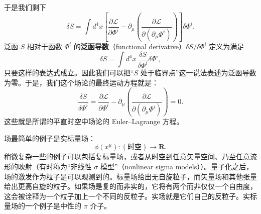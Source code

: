 于是我们剩下
\begin{equation*}
\delta S = \int d^{4}x\left[\frac{\partial\mathcal{L}}{\partial\Phi^{i}} - \partial_{\mu}\left(\frac{\partial\mathcal{L}}{\partial(\partial_{\mu}\Phi^{i})}\right)\right]\delta\Phi^{i}.
\tag{1.142}
\end{equation*}
泛函 $S$ 相对于函数 $\Phi^{i}$ 的\textbf{泛函导数}（functional derivative）$\delta S/\delta\Phi^{i}$ 定义为满足
\begin{equation*}
\delta S = \int d^{4}x\, \frac{\delta S}{\delta\Phi^{i}}\delta\Phi^{i},
\tag{1.143}
\end{equation*}
只要这样的表达式成立。因此我们可以把“$S$ 处于临界点”这一说法表述为泛函导数为零。于是，我们这个场论的最终运动方程就是：
\begin{equation*}
\boxed{\;\frac{\delta S}{\delta\Phi^{i}} = \frac{\partial\mathcal{L}}{\partial\Phi^{i}} - \partial_{\mu}\left(\frac{\partial\mathcal{L}}{\partial(\partial_{\mu}\Phi^{i})}\right) = 0.\;}
\tag{1.144}
\end{equation*}
这些就是所谓的平直时空中场论的 Euler--Lagrange 方程。

场最简单的例子是实标量场：
\begin{equation*}
\phi(x^{\mu}) : (\text{时空}) \rightarrow \mathbf{R}.
\tag{1.145}
\end{equation*}
稍微复杂一些的例子可以包括复标量场，或者从时空到任意矢量空间、乃至任意流形的映射（有时称为“非线性 $\sigma$ 模型”（nonlinear sigma models））。量子化之后，场的激发作为粒子是可以观测到的。标量场给出无自旋粒子，而矢量场和其他张量给出更高自旋的粒子。如果场是复的而非实的，它将有两个而非仅仅一个自由度，这会被诠释为一个粒子加上一个不同的反粒子。实场就是它们自己的反粒子。实标量场的一个例子是中性的 $\pi$ 介子。

